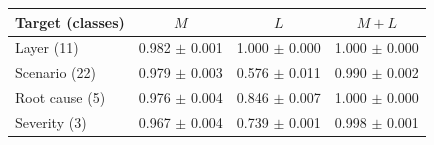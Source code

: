 \begin{tabular}{@{}lccc@{}}
\toprule
Target (classes) & $M$ & $L$ & $M+L$ \\
\midrule
Layer (11) & 0.982 $\pm$ 0.001 & 1.000 $\pm$ 0.000 & 1.000 $\pm$ 0.000 \\
Scenario (22) & 0.979 $\pm$ 0.003 & 0.576 $\pm$ 0.011 & 0.990 $\pm$ 0.002 \\
Root cause (5) & 0.976 $\pm$ 0.004 & 0.846 $\pm$ 0.007 & 1.000 $\pm$ 0.000 \\
Severity (3) & 0.967 $\pm$ 0.004 & 0.739 $\pm$ 0.001 & 0.998 $\pm$ 0.001 \\
\bottomrule
\end{tabular}
